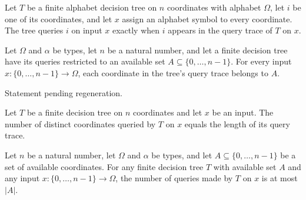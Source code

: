 \begin{definition}
\label{FABL.FiniteDecisionTree.Queries}
\leanok
{}
Let $T$ be a finite alphabet decision tree on $n$ coordinates with alphabet $Ω$, let $i$
be one of its coordinates, and let $x$ assign an alphabet symbol to every coordinate.
The tree queries $i$ on input $x$ exactly when $i$ appears in the query trace of $T$ on
$x$.
\end{definition}

\begin{theorem}
\label{FABL.FiniteDecisionTree.queryTrace_subset_available}
\leanok
{}
Let $\Omega$ and $\alpha$ be types, let $n$ be a natural number, and let a finite
decision tree have its queries restricted to an available set
$A\subseteq\{0,\ldots,n-1\}$. For every input $x:\{0,\ldots,n-1\}\to\Omega$, each
coordinate in the tree's query trace belongs to $A$.
\end{theorem}

\begin{theorem}
\label{FABL.FiniteDecisionTree.queryTrace_nodup}
\leanok
{}
Statement pending regeneration.
\end{theorem}

\begin{theorem}
\label{FABL.FiniteDecisionTree.card_querySet_eq_queryCount}
\leanok
{}
Let $T$ be a finite decision tree on $n$ coordinates and let $x$ be an input. The number
of distinct coordinates queried by $T$ on $x$ equals the length of its query trace.
\end{theorem}

\begin{theorem}
\label{FABL.FiniteDecisionTree.queryCount_le_card_available}
\leanok
{}
Let $n$ be a natural number, let $\Omega$ and $\alpha$ be types, and let
$A\subseteq\{0,\ldots,n-1\}$ be a set of available coordinates. For any finite decision
tree $T$ with available set $A$ and any input $x:\{0,\ldots,n-1\}\to\Omega$, the number
of queries made by $T$ on $x$ is at most $|A|$.
\end{theorem}

